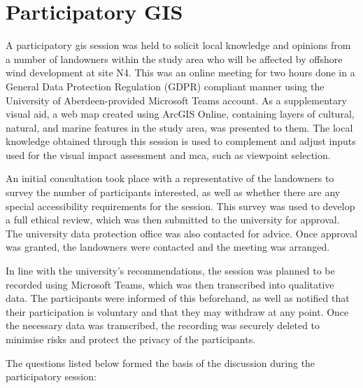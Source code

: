 \section{Participatory GIS}

A participatory \gls{gis} session was held to solicit local knowledge and
opinions from a number of landowners within the study area who will be affected
by offshore wind development at site N4. This was an online meeting for two
hours done in a General Data Protection Regulation (GDPR) compliant manner
using the University of Aberdeen-provided Microsoft Teams account. As a
supplementary visual aid, a web map created using ArcGIS Online, containing
layers of cultural, natural, and marine features in the study area, was
presented to them. The local knowledge obtained through this session is used to
complement and adjust inputs used for the visual impact assessment and
\gls{mca}, such as viewpoint selection.

An initial consultation took place with a representative of the landowners to
survey the number of participants interested, as well as whether there are any
special accessibility requirements for the session. This survey was used to
develop a full ethical review, which was then submitted to the university for
approval. The university data protection office was also contacted for advice.
Once approval was granted, the landowners were contacted and the meeting was
arranged.

In line with the university's recommendations, the session was planned to be
recorded using Microsoft Teams, which was then transcribed into qualitative
data. The participants were informed of this beforehand, as well as notified
that their participation is voluntary and that they may withdraw at any point.
Once the necessary data was transcribed, the recording was securely deleted to
minimise risks and protect the privacy of the participants.

The questions listed below formed the basis of the discussion during the
participatory session:

